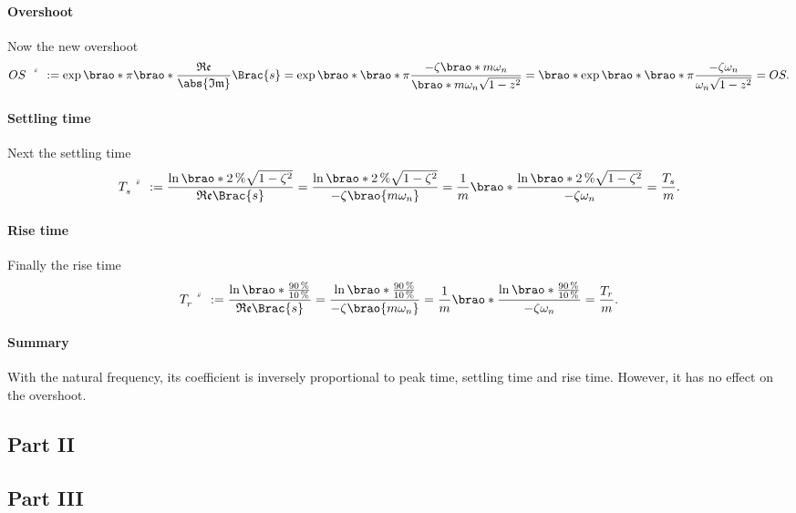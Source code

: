 \documentclass[11pt]{article}
\begin{document}
\begin{adjustwidth}{0.5in}{0in}
        \paragraph{Overshoot}
        Now the new overshoot
        \[
                \setprime[2]{OS}
                := \exp\brao*{\pi\brao*{\frac{\mathfrak{Re}}{\abs{\mathfrak{Im}}}}\Brac{s}}
                = \exp\brao*{\brao*\pi\frac
                    {-\zeta\brao*{m\omega_n}}
                    {\brao*{m\omega_n} \sqrt{1 - z^2}}
                }
                = \brao*{\exp\brao*{\brao*\pi\frac
                    {-\zeta\omega_n}
                    {\omega_n \sqrt{1 - z^2}}
                }}
                = OS.
        \]

        \paragraph{Settling time}
        Next the settling time
        \[
            \setprime[2]{T}_s
            := \frac{\ln\brao*{\SI2\percent \sqrt{1 - \zeta^2}}}{\mathfrak{Re}\Brac{s}}
            = \frac{\ln\brao*{\SI2\percent \sqrt{1 - \zeta^2}}}{-\zeta\brao{m\omega_n}}
            = \frac1m\brao*{\frac{\ln\brao*{\SI2\percent \sqrt{1 - \zeta^2}}}{-\zeta\omega_n}}
            = \frac{T_s}m.
        \]

        \paragraph{Rise time}
        Finally the rise time
        \[
            \setprime[2]T_r
            := \frac{\ln\brao*{\frac
                {\SI{90}\percent}
                {\SI{10}\percent}
            }}{\mathfrak{Re}\Brac{s}}
            = \frac{\ln\brao*{\frac
                {\SI{90}\percent}
                {\SI{10}\percent}
            }}{-\zeta\brao{m\omega_n}}
            = \frac1m\brao*{
                \frac{\ln\brao*{\frac
                    {\SI{90}\percent}
                    {\SI{10}\percent}
                }}{-\zeta\omega_n}
            }
            = \frac{T_r}m.
        \]

        \paragraph{Summary}
        With the natural frequency, its coefficient is inversely proportional to peak time, settling time and rise time. However, it has no effect on the overshoot.
    \subsection{Part II}
    \subsection{Part III}
\end{adjustwidth}
\end{document}
